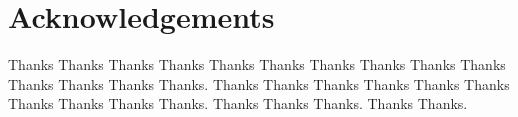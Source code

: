 \chapter*{Acknowledgements}

Thanks Thanks Thanks Thanks Thanks Thanks Thanks Thanks Thanks Thanks Thanks Thanks Thanks Thanks. 
Thanks Thanks Thanks Thanks Thanks Thanks Thanks Thanks Thanks Thanks.
Thanks Thanks Thanks. Thanks Thanks.